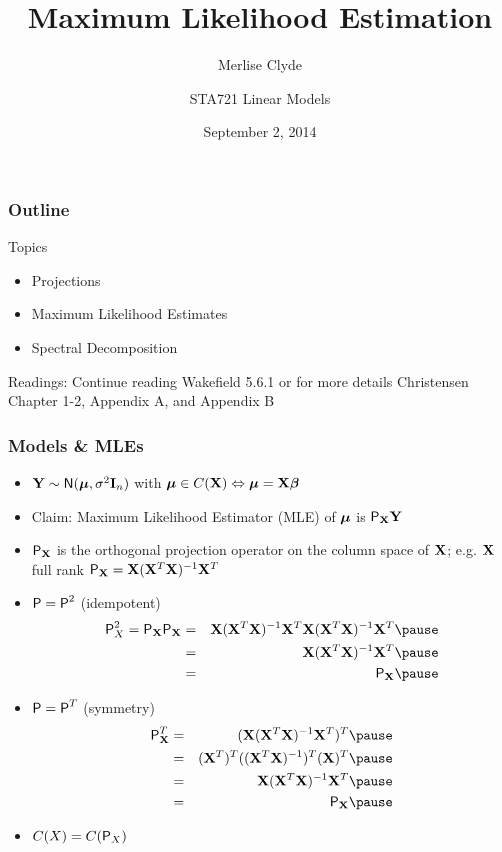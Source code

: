 \documentclass{beamer}
\title{Maximum Likelihood Estimation}
\subtitle{Merlise Clyde}
\author{STA721 Linear Models}
\institute{Duke University}
\date{September 2, 2014}
\begin{document}
\maketitle

\begin{frame}\frametitle{Outline}
Topics
  \begin{itemize}
  \item Projections
  \item Maximum Likelihood Estimates
  \item Spectral Decomposition


  \end{itemize}


Readings: Continue reading Wakefield 5.6.1  or for more details Christensen Chapter 1-2, Appendix A, and Appendix B
\end{frame}

\begin{frame} \frametitle{Models \& MLEs}
  \begin{itemize}
  \item   $\Y \sim \N(\mub, \sigma^2 \I_n)$ with $\mub \in C(\X)
    \Leftrightarrow \mub = \X \b$  \pause
  \item   Claim: Maximum Likelihood Estimator (MLE) of $\mub$ is
    $\P_\X \Y$  \pause
\item $\P_\X$ is the orthogonal projection operator on the column
  space of $\X$; e.g. $\X$ full rank $\P_\X = \X (\X^T\X)^{-1} \X^T$
\item $\P = \P^2$  (idempotent)  \pause
  \begin{eqnarray*}
 \P_X^2 = \P_\X \P_\X & = &\X(\X^T\X)^{-1} \X^T\X(\X^T\X)^{-1} \X^T   \pause \\
             & = & \X(\X^T\X)^{-1}\X^T \pause\\
 & = & \P_{\X} \pause
  \end{eqnarray*}
\item $\P = \P^T$ (symmetry)  \pause
 \begin{eqnarray*}
 \P_\X^T  & = & (\X(\X^T\X)^{-1}\X^T)^T \pause \\
             & = & (\X^T)^T((\X^T\X)^{-1})^T(\X)^T \pause \\
 & = &  \X(\X^T\X)^{-1}\X^T \pause \\
 & = & \P_{\X} \pause
  \end{eqnarray*}
\item $C(X) = C(\P_X)$ 
\end{itemize}
\end{frame}
\end{document}
